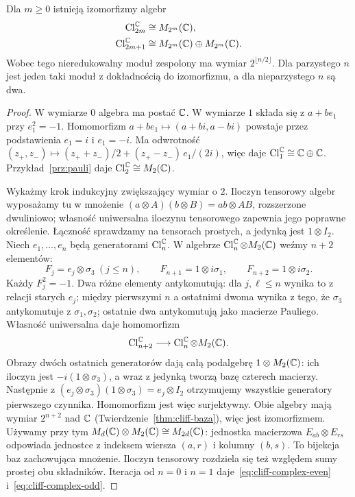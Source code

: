 \begin{twierdzenie}
\label{thm:cliff-kompleks}
Dla $m\geq0$ istnieją izomorfizmy algebr
\begin{align}
 \operatorname{Cl}^{\mathbb{C}}_{2m}
   &\cong M_{2^m}(\mathbb{C}), \label{eq:cliff-complex-even}\\
 \operatorname{Cl}^{\mathbb{C}}_{2m+1}
   &\cong M_{2^m}(\mathbb{C})\oplus M_{2^m}(\mathbb{C}).
   \label{eq:cliff-complex-odd}
\end{align}
Wobec tego nieredukowalny moduł zespolony
ma wymiar $2^{\lfloor n/2\rfloor}$.
Dla parzystego $n$ jest jeden taki moduł
z dokładnością do izomorfizmu, a dla
nieparzystego $n$ są dwa.
\end{twierdzenie}
\begin{proof}
W wymiarze $0$ algebra ma postać $\mathbb{C}$.
W wymiarze $1$ składa się z $a+be_1$ przy
$e_1^2=-1$. Homomorfizm
$a+be_1\mapsto(a+bi,a-bi)$ powstaje przez podstawienia
$e_1=i$ i $e_1=-i$.
Ma odwrotność
$(z_+,z_-)\mapsto(z_++z_-)/2+(z_+-z_-)\,e_1/(2i)$,
więc daje $\operatorname{Cl}^{\mathbb{C}}_1\cong\mathbb{C}\oplus\mathbb{C}$.
Przykład~\ref{prz:pauli} daje
$\operatorname{Cl}^{\mathbb{C}}_2\cong M_2(\mathbb{C})$.

Wykażmy krok indukcyjny zwiększający wymiar o $2$.
Iloczyn tensorowy algebr wyposażamy tu w mnożenie
$(a\otimes A)(b\otimes B)=ab\otimes AB$, rozszerzone
dwuliniowo; własność uniwersalna iloczynu tensorowego zapewnia
jego poprawne określenie. Łączność sprawdzamy na tensorach
prostych, a jedynką jest $1\otimes I_2$.
Niech $e_1,\ldots,e_n$ będą generatorami
$\operatorname{Cl}^{\mathbb{C}}_n$. W algebrze
$\operatorname{Cl}^{\mathbb{C}}_n\otimes M_2(\mathbb{C})$
weźmy $n+2$ elementów:
\[
 F_j=e_j\otimes\sigma_3\ (j\leq n),\qquad
 F_{n+1}=1\otimes i\sigma_1,\qquad
 F_{n+2}=1\otimes i\sigma_2.
\]
Każdy $F_j^2=-1$. Dwa różne elementy
antykomutują: dla $j,\ell\leq n$ wynika
to z relacji starych $e_j$; między pierwszymi
$n$ a ostatnimi dwoma wynika z tego, że
$\sigma_3$ antykomutuje z $\sigma_1,\sigma_2$;
ostatnie dwa antykomutują jako macierze Pauliego.
Własność uniwersalna daje homomorfizm
\[
 \operatorname{Cl}^{\mathbb{C}}_{n+2}
    \longrightarrow
   \operatorname{Cl}^{\mathbb{C}}_n\otimes M_2(\mathbb{C}).
\]
Obrazy dwóch ostatnich generatorów dają całą
podalgebrę $1\otimes M_2(\mathbb{C})$:
ich iloczyn jest $-i(1\otimes\sigma_3)$,
a wraz z jedynką tworzą bazę czterech macierzy.
Następnie z
$(e_j\otimes\sigma_3)(1\otimes\sigma_3)
=e_j\otimes I_2$ otrzymujemy wszystkie
generatory pierwszego czynnika. Homomorfizm
jest więc surjektywny. Obie algebry mają
wymiar $2^{n+2}$ nad $\mathbb{C}$
(Twierdzenie~\ref{thm:cliff-baza}),
więc jest izomorfizmem. Używamy przy tym
$M_d(\mathbb{C})\otimes M_2(\mathbb{C})\cong M_{2d}(\mathbb{C})$:
jednostka macierzowa $E_{ab}\otimes E_{rs}$ odpowiada
jednostce z indeksem wiersza $(a,r)$ i kolumny $(b,s)$.
To bijekcja baz zachowująca mnożenie. Iloczyn tensorowy
rozdziela się też względem sumy prostej obu składników.
Iteracja od $n=0$
i $n=1$ daje~\eqref{eq:cliff-complex-even}
i~\eqref{eq:cliff-complex-odd}.


\end{proof}
